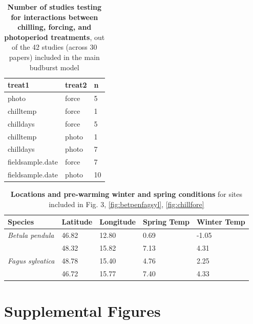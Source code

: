 \documentclass{article}
\begin{document}
\begin{footnotesize}
\begin{table}[ht]
\centering
\caption{\textbf{Number of studies testing for interactions between chilling, forcing, and photoperiod treatments}, out of the 42 studies (across 30 papers) included in the main budburst model} 
\label{tab:intxn}
\begingroup\footnotesize
\begin{tabular}{|p{}|p{}|p{}|}
  \hline
treat1 & treat2 & n \\ 
  \hline
photo & force &   5 \\ 
  chilltemp & force &   1 \\ 
  chilldays & force &   5 \\ 
  chilltemp & photo &   1 \\ 
  chilldays & photo &   7 \\ 
  fieldsample.date & force &   7 \\ 
  fieldsample.date & photo &  10 \\ 
   \hline
\end{tabular}
\endgroup
\end{table}
\begin{table}[ht]
\centering
\caption{\textbf{Locations and pre-warming winter and spring conditions} for sites included in Fig. 3, \ref{fig:betpenfagsyl}, \ref{fig:chillfore}} 
\label{tab:clim}
\begingroup\footnotesize
\begin{tabular}{|p{}|p{}|p{}|p{}|p{}|}
  \hline
Species & Latitude & Longitude & Spring Temp & Winter Temp \\ 
  \hline
\textit{Betula pendula} & 46.82 & 12.80 & 0.69 & -1.05 \\ 
  \textit{} & 48.32 & 15.82 & 7.13 & 4.31 \\ 
  \textit{Fagus sylvatica} & 48.78 & 15.40 & 4.76 & 2.25 \\ 
  \textit{} & 46.72 & 15.77 & 7.40 & 4.33 \\ 
   \hline
\end{tabular}
\endgroup
\end{table}\end{footnotesize} 

\newpage
\section* {Supplemental Figures}
\end{document}
